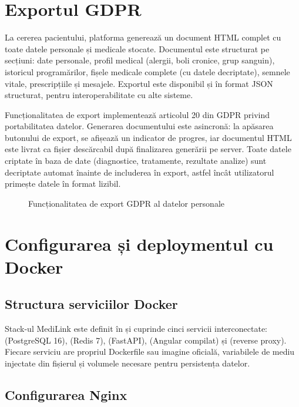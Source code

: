 \section{Exportul GDPR}

La cererea pacientului, platforma generează un document HTML complet cu toate datele personale și medicale stocate. Documentul este structurat pe secțiuni: date personale, profil medical (alergii, boli cronice, grup sanguin), istoricul programărilor, fișele medicale complete (cu datele decriptate), semnele vitale, prescripțiile și mesajele. Exportul este disponibil și în format JSON structurat, pentru interoperabilitate cu alte sisteme.

Funcționalitatea de export implementează articolul 20 din GDPR privind portabilitatea datelor. Generarea documentului este asincronă: la apăsarea butonului de export, se afișează un indicator de progres, iar documentul HTML este livrat ca fișier descărcabil după finalizarea generării pe server. Toate datele criptate în baza de date (diagnostice, tratamente, rezultate analize) sunt decriptate automat înainte de includerea în export, astfel încât utilizatorul primește datele în format lizibil.

\begin{figure}[H]
  \centering
  \caption{Funcționalitatea de export GDPR al datelor personale}
  \label{fig:export_gdpr}
\end{figure}

\section{Configurarea și deploymentul cu Docker}

\subsection{Structura serviciilor Docker}

Stack-ul MediLink este definit în  și cuprinde cinci servicii interconectate:  (PostgreSQL 16),  (Redis 7),  (FastAPI),  (Angular compilat) și  (reverse proxy). Fiecare serviciu are propriul Dockerfile sau imagine oficială, variabilele de mediu injectate din fișierul  și volumele necesare pentru persistența datelor.

\subsection{Configurarea Nginx}

